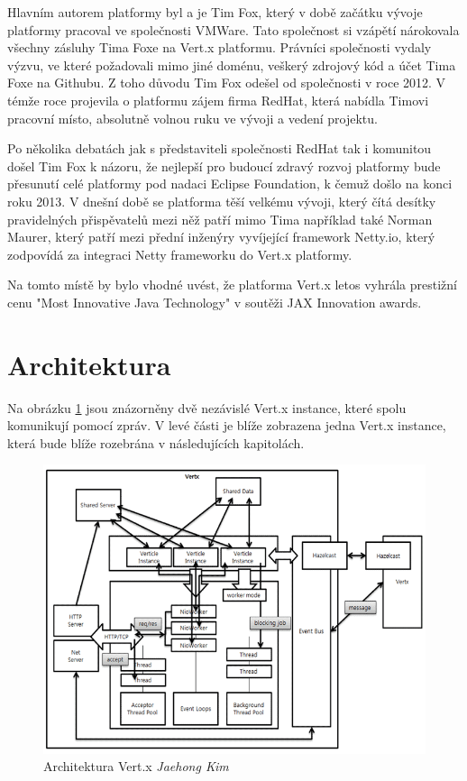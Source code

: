Hlavním autorem platformy byl a je Tim Fox, který v době začátku vývoje platformy pracoval ve společnosti VMWare. Tato společnost si vzápětí nárokovala všechny zásluhy Tima Foxe na Vert.x platformu. Právníci společnosti vydaly výzvu, ve které požadovali mimo jiné doménu, veškerý zdrojový kód a účet Tima Foxe na Githubu. Z toho důvodu Tim Fox odešel od společnosti v roce 2012. V témže roce projevila o platformu zájem firma RedHat, která nabídla Timovi pracovní místo, absolutně volnou ruku ve vývoji a vedení projektu\citep{whoControlVertx}. 

Po několika debatách jak s představiteli společnosti RedHat tak i komunitou došel Tim Fox k názoru, že nejlepší pro budoucí zdravý rozvoj platformy bude přesunutí celé platformy pod nadaci Eclipse Foundation, k čemuž došlo na konci roku 2013. V dnešní době se platforma těší velkému vývoji, který čítá desítky  pravidelných přispěvatelů mezi něž patří mimo Tima například také Norman Maurer, který patří mezi přední inženýry vyvíjející framework Netty.io, který zodpovídá za integraci Netty frameworku do Vert.x platformy. 

Na tomto místě by bylo vhodné uvést, že platforma Vert.x letos vyhrála prestižní cenu "Most Innovative Java Technology" v soutěži JAX Innovation awards\citep{JAX}.

\section{Architektura}

Na obrázku \ref{fig:vertxArchitectureDiagram} jsou znázorněny dvě nezávislé Vert.x instance, které spolu komunikují pomocí zpráv. V levé části je blíže zobrazena jedna Vert.x instance, která bude blíže rozebrána v následujících kapitolách.

\begin{figure}
\begin{centering}
\includegraphics[width	=1\textwidth]{obrazky/vertx-architecture-diagram}
\par\end{centering}
\caption{Architektura Vert.x \emph{Jaehong Kim} \label{fig:vertxArchitectureDiagram}}
\end{figure}

